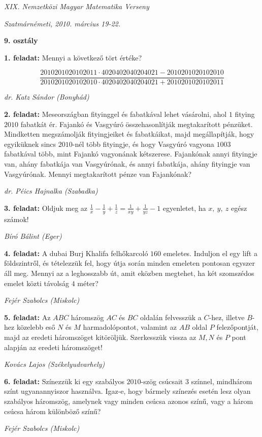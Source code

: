 \documentclass[a4paper,10pt]{article}
\def\ki#1#2{\hfill {\it #1 (#2)}\medskip}
\begin{document}
\begin{center} \Large {\em XIX. Nemzetközi Magyar Matematika Verseny} \end{center}
\begin{center} \large{\em Szatmárnémeti, 2010. március 19-22.} \end{center}
\smallskip
\begin{center} \large{\bf 9. osztály} \end{center}
\bigskip 

{\bf 1. feladat: } Mennyi a következő tört értéke?

$$\frac{2010201020102011\cdot4020402040204021-2010201020102010}{2010201020102010\cdot4020402040204021+2010201020102011}$$

\ki{dr. Katz Sándor}{Bonyhád}\medskip

{\bf 2. feladat: } Meseországban fityinggel és fabatkával lehet vásá\-rolni, ahol $1$
fitying $2010$ fabatkát ér. Fajankó és Vasgyúró összehasonlítják
megtakarított pénzüket. Mindketten megszámolják fityingjeiket és
fabatkáikat, majd megállapítják, hogy egyiküknek sincs $2010$-nél
több fityingje, és hogy Vasgyúró va\-gyo\-na $1003$ fabatkával több,
mint Fajankó vagyonának kétszerese. Fajankónak annyi fityingje van,
ahány fabatkája van Vasgyúrónak, és annyi fabatkája, ahány
fityingje van Vasgyúrónak. Mennyi megtakarított pénze van
Fajankónak?

\ki{dr. Péics Hajnalka}{Szabadka}\medskip

{\bf 3. feladat: } Oldjuk meg az
$\displaystyle{\frac{1}{x}-\frac{1}{y}+\frac{1}{z}=\frac{1}{xy}+\frac{1}{yz}-1}$
egyenletet, ha $x,\ y,\ z$ egész számok!

\ki{Bíró Bálint}{Eger}\medskip

{\bf 4. feladat: } A dubai Burj Khalifa felhőkarcoló $160$ emele\-tes.  Induljon el egy
lift a föld\-szint\-ről, és tételezzük fel, hogy útja során minden
emeleten pontosan egyszer áll meg. Mennyi az a leghosszabb út,
amit eközben megtehet, ha két szomszédos emelet közti
távolság $4$ méter?

\ki{Fejér Szabolcs}{Miskolc}\medskip

{\bf 5. feladat: } Az $ABC$ háromszög $AC$ és $BC$ oldalán felvesszük a
$C$-hez, illetve $B$-hez közelebb eső $N$ és $M$
harmadolópontot, valamint az $AB$ oldal $P$ felezőpontját,
majd az eredeti háromszöget kitöröljük. Szer\-kesszük
vissza az $M,N$ és $P$ pont alapján az eredeti háromszöget!

\ki{Kovács Lajos}{Székelyudvarhely}\medskip

{\bf 6. feladat: } Színezzük ki egy szabályos $2010$-szög csú\-csait $3$ színnel,
mindhárom színt ugyanannyiszor használva.  Igaz-e, hogy bár\-mely
színezés esetén lesz olyan szabályos háromszög, amelynek vagy minden
csúcsa azonos színű,  vagy a három csúcsa három különböző
színű?

\ki{Fejér Szabolcs}{Miskolc}\medskip

\vfill
\end{document}
